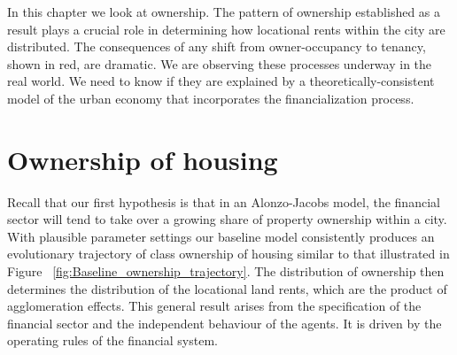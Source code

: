 


In this chapter we look at ownership. The pattern of ownership established as a result plays a crucial role in determining how locational rents within the city are distributed. The consequences of any shift from owner-occupancy to tenancy, shown in red, are dramatic. 
We are observing these processes underway in the real world. We need to know if they are explained by a theoretically-consistent model of the urban economy that incorporates the financialization process.

\section{Ownership of housing}

Recall that our first hypothesis is that in an \Gls{Alonzo-Jacobs model}, the financial sector will tend to take over a growing share of property ownership within a city. 
With  plausible parameter settings our baseline model consistently produces an evolutionary trajectory of class ownership of housing similar to that illustrated in Figure ~\ref{fig:Baseline_ownership_trajectory}. The distribution of ownership then determines the distribution of the locational land rents, which are the product of agglomeration effects. This general result arises from the specification of the financial sector and the independent behaviour of the agents. It is driven by the operating rules of the financial system. 


